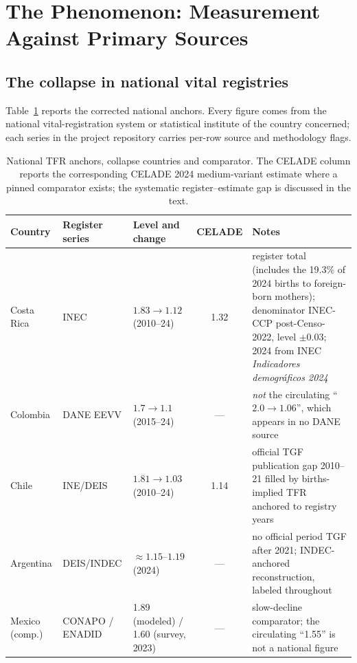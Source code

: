 \section{The Phenomenon: Measurement Against Primary Sources}
\label{sec:phenomenon}

\subsection{The collapse in national vital registries}
\label{sec:registries}

Table~\ref{tab:anchors} reports the corrected national anchors. Every figure
comes from the national vital-registration system or statistical institute of
the country concerned; each series in the project repository carries per-row
source and methodology flags.

\begin{table}[t]
\centering
\caption{National TFR anchors, collapse countries and comparator. The CELADE
column reports the corresponding CELADE 2024 medium-variant estimate where a
pinned comparator exists; the systematic register--estimate gap is discussed
in the text.}
\label{tab:anchors}
\footnotesize
\begin{tabular}{@{}l l l c p{4.9cm}@{}}
\toprule
Country & Register series & Level and change & CELADE & Notes \\
\midrule
Costa Rica & INEC & $1.83 \rightarrow 1.12$ (2010--24) & 1.32 &
  register total (includes the 19.3\% of 2024 births to foreign-born mothers);
  denominator INEC-CCP post-Censo-2022, level $\pm$0.03; 2024 from INEC
  \emph{Indicadores demogr\'aficos 2024} \\
Colombia & DANE EEVV & $1.7 \rightarrow 1.1$ (2015--24) & --- &
  \emph{not} the circulating ``$2.0 \rightarrow 1.06$'', which appears in no
  DANE source \\
Chile & INE/DEIS & $1.81 \rightarrow 1.03$ (2010--24) & 1.14 &
  official TGF publication gap 2010--21 filled by births-implied TFR anchored
  to registry years \\
Argentina & DEIS/INDEC & $\approx 1.15$--$1.19$ (2024) & --- &
  no official period TGF after 2021; INDEC-anchored reconstruction, labeled
  throughout \\
Mexico (comp.) & CONAPO / ENADID & 1.89 (modeled) / 1.60 (survey, 2023) & --- &
  slow-decline comparator; the circulating ``1.55'' is not a national figure \\
\bottomrule
\end{tabular}
\end{table}

